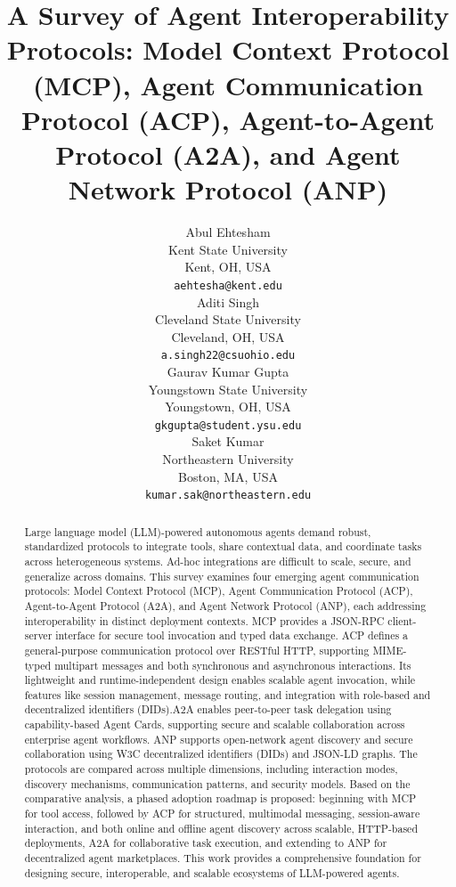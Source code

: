 \documentclass{article}
\title{
A Survey of Agent Interoperability Protocols: Model Context Protocol (MCP), Agent Communication Protocol (ACP), Agent-to-Agent Protocol (A2A), and Agent Network Protocol (ANP)}
\author{
  Abul Ehtesham \\
  Kent State University \\
  Kent, OH, USA \\
  \texttt{aehtesha@kent.edu} \\
  \And
  Aditi Singh \\
  Cleveland State University \\
  Cleveland, OH, USA \\
  \texttt{a.singh22@csuohio.edu} \\
  \And
  Gaurav Kumar Gupta \\
  Youngstown State University \\
  Youngstown, OH, USA \\
  \texttt{gkgupta@student.ysu.edu} \\
  \And
  Saket Kumar \\
  Northeastern University \\
  Boston, MA, USA \\
  \texttt{kumar.sak@northeastern.edu} \\
}
\begin{document}
\maketitle


\begin{abstract}
Large language model (LLM)-powered autonomous agents demand robust, standardized protocols to integrate tools, share contextual data, and coordinate tasks across heterogeneous systems. Ad-hoc integrations are difficult to scale, secure, and generalize across domains. This survey examines four emerging agent communication protocols: Model Context Protocol (MCP), Agent Communication Protocol (ACP), Agent-to-Agent Protocol (A2A), and Agent Network Protocol (ANP), each addressing interoperability in distinct deployment contexts. MCP provides a JSON-RPC client-server interface for secure tool invocation and typed data exchange. ACP defines a general-purpose communication protocol over RESTful HTTP, supporting MIME-typed multipart messages and both synchronous and asynchronous interactions. Its lightweight and runtime-independent design enables scalable agent invocation, while features like session management, message routing, and integration with role-based and decentralized identifiers (DIDs).A2A enables peer-to-peer task delegation using capability-based Agent Cards, supporting secure and scalable collaboration across enterprise agent workflows. ANP supports open-network agent discovery and secure collaboration using W3C decentralized identifiers (DIDs) and JSON-LD graphs. The protocols are compared across multiple dimensions, including interaction modes, discovery mechanisms, communication patterns, and security models. Based on the comparative analysis, a phased adoption roadmap is proposed: beginning with MCP for tool access, followed by ACP for structured, multimodal messaging, session-aware interaction, and both online and offline agent discovery across scalable, HTTP-based deployments, A2A for collaborative task execution, and extending to ANP for decentralized agent marketplaces. This work provides a comprehensive foundation for designing secure, interoperable, and scalable ecosystems of LLM-powered agents.
\end{abstract}




\end{document}
